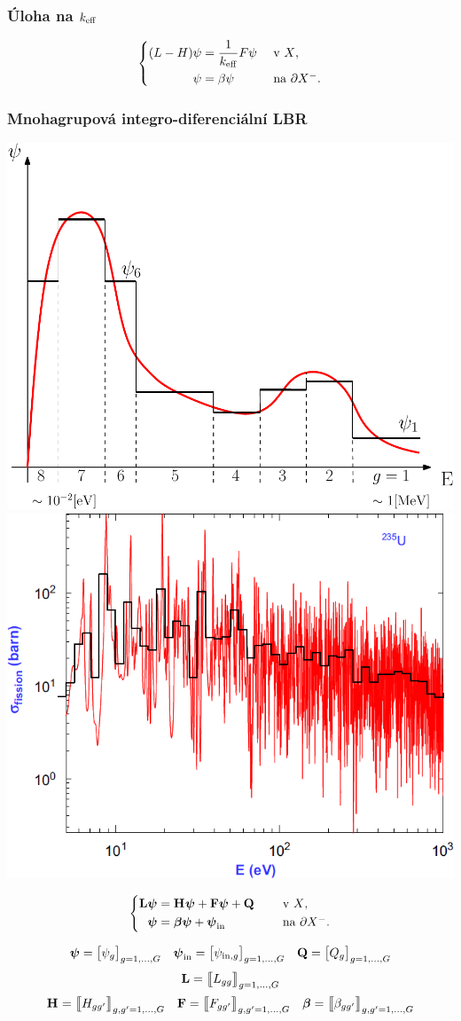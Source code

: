 \begin{frame}
  \frametitle{Úloha na $\keff$}
  
  $$
  \left\{
    \begin{aligned}
       (L-H)\angflux &= \frac{1}{\keff} F\angflux &&\mbox{ v $X$,}\\
	  \angflux  &= \beta\angflux \quad   &&\mbox{ na $\pX[-]$.}
    \end{aligned}
  \right.
$$

\end{frame}

\begin{frame}
  \frametitle{Mnohagrupová integro-diferenciální LBR}
  
  \vspace{-1.25em}
  
  \hbox{}\hfill\includegraphics[width=.425\textwidth]{obr/fluxg}\hfill
  \includegraphics[width=.425\textwidth]{obr/U235fg}\hfill\hbox{}
  
  \shorten{-.6em}{0em}

  $$
  \left\{
    \begin{aligned}
    \llop\vangflux &= \hhop\vangflux + \ffop\vangflux + \QQ\quad &&\mbox{ v $X$,}\\
    \vangflux  &= \valbedo\vangflux + \vangflux_{\mathrm{in}}\quad   &&\mbox{ na $\pX[-]$}.
  \end{aligned}
  \right.
  $$

  \begin{gather*}
    \vangflux = \big[\angflux_g\big]_{g=1,\ldots, G}\quad
    \vangflux_{\mathrm{in}} = \big[\angflux_{\mathrm{in},g}\big]_{g=1,\ldots, G}\quad
    \QQ = \big[Q_g\big]_{g=1,\ldots, G}\\[.3em] 
    \llop = \big\llbracket L_{gg} \big\rrbracket_{g=1,\ldots, G} \\[.2em]
    \hhop = \big\llbracket H_{gg'}\big\rrbracket_{g,g'=1,\ldots, G} \quad
    \ffop = \big\llbracket F_{gg'}\big\rrbracket_{g,g'=1,\ldots, G} \quad
    \valbedo = \big\llbracket \beta_{gg'}\big\rrbracket_{g,g'=1,\ldots, G}
  \end{gather*}
  
  \lengthen
    
\end{frame}

